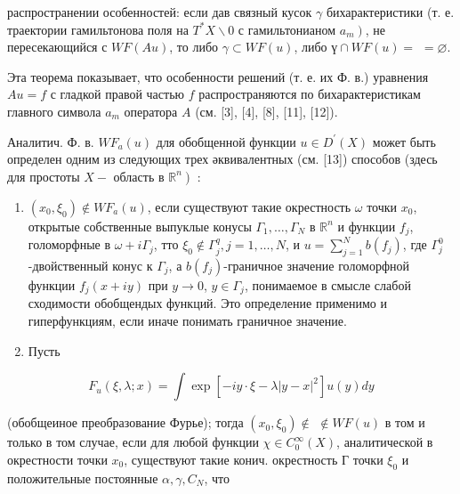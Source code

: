 \documentclass[10pt]{article}
\begin{document}
распространении особенностей: если дав связный кусок $\gamma$ бихарактеристики (т. е. траектории гамильтонова поля на $T^{*} X \backslash 0$ с гамильтонианом $\left.a_{m}\right)$, не пересекающийся с $W F(A u)$, то либо $\gamma \subset W F(u)$, либо $ү \cap W F(u)=$ $=\varnothing$.



Эта теорема показывает, что особенности решений (т. е. их Ф. в.) уравнения $A u=f$ с гладкой правой частью $f$ распространяются по бихарактеристикам главного символа $a_{m}$ оператора $A$ (см. [3], [4], [8], [11], [12]).



Аналитич. Ф. в. $W F_{a}(u)$ для обобщенной функции $u \in D^{\prime}(X)$ может быть определен одним из следующих трех әквивалентных (см. [13]) способов (здесь для простоты $X-$ область в $\left.\mathbb{R}^{n}\right)$ :



\begin{enumerate}

  \item $\left(x_{0}, \xi_{0}\right) \notin W F_{a}(u)$, если существуют такие окрестность $\omega$ точки $x_{0}$, открытые собственные выпуклые конусы $\Gamma_{1}, \ldots, \Gamma_{N}$ в $\mathbb{R}^{n}$ и функции $f_{j}$, голоморфные в $\omega+i \Gamma_{j}$, тто $\xi_{0} \notin \Gamma_{j}^{q}, j=1, \ldots, N$, и $u=\sum_{j=1}^{N} b\left(f_{j}\right)$, где $\Gamma_{j}^{0}$-двойственный конус к $\Gamma_{j}$, а $b\left(f_{j}\right)$-граничное значение голоморфной функции $f_{j}(x+i y)$ при $y \longrightarrow 0$, $y \in \Gamma_{j}$, понимаемое в смысле слабой сходимости обобщендых функций. Это определение применимо и гиперфункциям, если иначе понимать граничное значение.



  \item Пусть



\end{enumerate}



\[

F_{u}(\xi, \lambda ; x)=\int \exp \left[-i y \cdot \xi-\lambda|y-x|^{2}\right] u(y) d y

\]



(обобщеиное преобразование Фурье); тогда $\left(x_{0}, \xi_{0}\right) \notin$ $\notin W F(u)$ в том и только в том случае, если для любой функции $\chi \in C_{0}^{\infty}(X)$, аналитической в окрестности точки $x_{0}$, существуют такие конич. окрестность Г точки $\xi_{0}$ и положительные постоянные $\alpha, \gamma, C_{N}$, что
\end{document}
